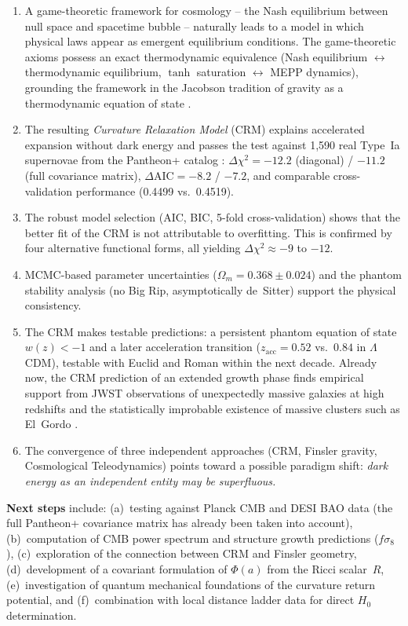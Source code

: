 \documentclass[aps,prd,twocolumn,superscriptaddress,nofootinbib]{revtex4-2}
\begin{document}
\begin{enumerate}
\item A game-theoretic framework for cosmology -- the Nash equilibrium between null space and spacetime bubble -- naturally leads to a model in which physical laws appear as emergent equilibrium conditions. The game-theoretic axioms possess an exact thermodynamic equivalence (Nash equilibrium $\leftrightarrow$ thermodynamic equilibrium, $\tanh$ saturation $\leftrightarrow$ MEPP dynamics), grounding the framework in the Jacobson tradition of gravity as a thermodynamic equation of state \cite{Jacobson1995}.
\item The resulting \textit{Curvature Relaxation Model} (CRM) explains accelerated expansion without dark energy and passes the test against 1,590 real Type~Ia supernovae from the Pantheon+ catalog \cite{Scolnic2022}: $\Delta\chi^2 = -12.2$ (diagonal) / $-11.2$ (full covariance matrix), $\Delta\mathrm{AIC} = -8.2$ / $-7.2$, and comparable cross-validation performance (0.4499 vs.\ 0.4519).
\item The robust model selection (AIC, BIC, 5-fold cross-validation) shows that the better fit of the CRM is not attributable to overfitting. This is confirmed by four alternative functional forms, all yielding $\Delta\chi^2 \approx -9$ to $-12$.
\item MCMC-based parameter uncertainties ($\Omega_m = 0.368 \pm 0.024$) and the phantom stability analysis (no Big Rip, asymptotically de~Sitter) support the physical consistency.
\item The CRM makes testable predictions: a persistent phantom equation of state $w(z) < -1$ and a later acceleration transition ($z_{\mathrm{acc}} = 0.52$ vs.\ $0.84$ in $\Lambda$CDM), testable with Euclid and Roman within the next decade. Already now, the CRM prediction of an extended growth phase finds empirical support from JWST observations of unexpectedly massive galaxies at high redshifts \cite{Labbe2023, BoylanKolchin2023} and the statistically improbable existence of massive clusters such as El~Gordo \cite{Asencio2023}.
\item The convergence of three independent approaches (CRM, Finsler gravity, Cosmological Teleodynamics) points toward a possible paradigm shift: \textit{dark energy as an independent entity may be superfluous.}
\end{enumerate}

\textbf{Next steps} include: (a)~testing against Planck CMB and DESI BAO data (the full Pantheon+ covariance matrix has already been taken into account), (b)~computation of CMB power spectrum and structure growth predictions ($f\sigma_8$), (c)~exploration of the connection between CRM and Finsler geometry, (d)~development of a covariant formulation of $\Phi(a)$ from the Ricci scalar~$R$, (e)~investigation of quantum mechanical foundations of the curvature return potential, and (f)~combination with local distance ladder data for direct $H_0$ determination.
\end{document}
